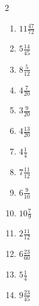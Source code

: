 \documentclass[12pt]{article}
\begin{document}
\begin{multicols}{2}
\begin{enumerate}
\item $ 11 \frac{47}{72} $
\item $ 5 \frac{14}{45} $
\item $ 8 \frac{5}{12} $
\item $ 4 \frac{7}{20} $
\item $ 3 \frac{9}{20} $
\item $ 4 \frac{13}{20} $
\item $ 4 \frac{1}{4} $
\item $ 7 \frac{11}{12} $
\item $ 6 \frac{9}{10} $
\item $ 10 \frac{7}{9} $
\item $ 2 \frac{11}{12} $
\item $ 6 \frac{23}{60} $
\item $ 5 \frac{1}{4} $
\item $ 9 \frac{23}{45} $
\end{enumerate}\end{multicols}\newpage
\end{document}
